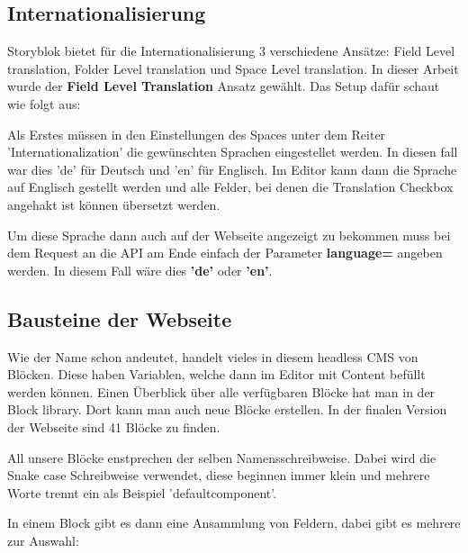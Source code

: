 \subsection{Internationalisierung}
Storyblok bietet für die Internationalisierung 3 verschiedene Ansätze: Field Level translation, Folder Level translation und Space Level translation. In dieser Arbeit wurde der \textbf{Field Level Translation} Ansatz gewählt. 
Das Setup dafür schaut wie folgt aus:

Als Erstes müssen in den Einstellungen des Spaces unter dem Reiter 'Internationalization' die gewünschten Sprachen eingestellet werden. In diesen fall war dies 'de' für Deutsch und 'en' für Englisch. 
Im Editor kann dann die Sprache auf Englisch gestellt werden und alle Felder, bei denen die Translation Checkbox angehakt ist können übersetzt werden. 

Um diese Sprache dann auch auf der Webseite angezeigt zu bekommen muss bei dem Request an die API am Ende einfach der Parameter \textbf{language=} angeben werden. In diesem Fall wäre dies \textbf{'de'} oder \textbf{'en'}.


\subsection{Bausteine der Webseite}
Wie der Name schon andeutet, handelt vieles in diesem headless CMS von Blöcken. Diese haben Variablen, welche dann im Editor mit Content befüllt werden können. 
Einen Überblick über alle verfügbaren Blöcke hat man in der Block library. Dort kann man auch neue Blöcke erstellen. In der finalen Version der Webseite sind 41 Blöcke zu finden. 

All unsere Blöcke enstprechen der selben Namensschreibweise. Dabei wird die Snake case Schreibweise verwendet, diese beginnen immer klein und mehrere Worte trennt ein \textunderscore  als Beispiel 'default\textunderscore component'.

In einem Block gibt es dann eine Ansammlung von Feldern, dabei gibt es mehrere zur Auswahl:


